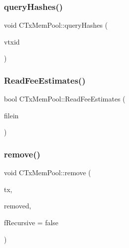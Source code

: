 \mbox{\label{class_c_tx_mem_pool_a42fa7d41a45562d02e356f2e7708bb02}} 
\subsubsection{\texorpdfstring{query\+Hashes()}{queryHashes()}}
{\footnotesize\ttfamily void C\+Tx\+Mem\+Pool\+::query\+Hashes (\begin{DoxyParamCaption}\item[{std\+::vector$<$ \mbox{\hyperlink{classuint256}{uint256}} $>$ \&}]{vtxid }\end{DoxyParamCaption})}

\mbox{\label{class_c_tx_mem_pool_a0dbbcb6a3b7e1a6c564410668c12cd4f}} 
\subsubsection{\texorpdfstring{Read\+Fee\+Estimates()}{ReadFeeEstimates()}}
{\footnotesize\ttfamily bool C\+Tx\+Mem\+Pool\+::\+Read\+Fee\+Estimates (\begin{DoxyParamCaption}\item[{\mbox{\hyperlink{class_c_auto_file}{C\+Auto\+File}} \&}]{filein }\end{DoxyParamCaption})}

\mbox{\label{class_c_tx_mem_pool_a3a497097d9d5f325a2922a3970ac9da2}} 
\subsubsection{\texorpdfstring{remove()}{remove()}}
{\footnotesize\ttfamily void C\+Tx\+Mem\+Pool\+::remove (\begin{DoxyParamCaption}\item[{const C\+Transaction \&}]{tx,  }\item[{std\+::list$<$ C\+Transaction $>$ \&}]{removed,  }\item[{bool}]{f\+Recursive = {\ttfamily false} }\end{DoxyParamCaption})}


